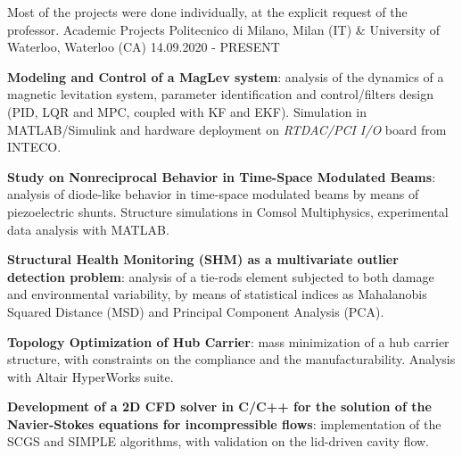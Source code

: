 

\begin{cventries}

    \cventry
    {Most of the projects were done individually, at the explicit request of the professor.}
    {Academic Projects}
    {Politecnico di Milano, Milan (IT) \& University of Waterloo, Waterloo (CA)}
    {14.09.2020 - PRESENT}
    {
        \begin{cvitems}
            \item {\textbf{Modeling and Control of a MagLev system}: analysis of the dynamics of a magnetic levitation system, parameter identification and control/filters design (PID, LQR and MPC, coupled with KF and EKF). Simulation in MATLAB/Simulink and hardware deployment on \textit{RTDAC/PCI I/O} board from INTECO.}
            \item {\textbf{Study on Nonreciprocal Behavior in Time-Space Modulated Beams}: analysis of diode-like behavior in time-space modulated beams by means of piezoelectric shunts. Structure simulations in Comsol Multiphysics, experimental data analysis with MATLAB.}
            \item {\textbf{Structural Health Monitoring (SHM) as a multivariate outlier detection problem}: analysis of a tie-rods element subjected to both damage and environmental variability, by means of statistical indices as Mahalanobis Squared Distance (MSD) and Principal Component Analysis (PCA).}
            \item {\textbf{Topology Optimization of Hub Carrier}: mass minimization of a hub carrier structure, with constraints on the compliance and the manufacturability. Analysis with Altair HyperWorks suite.}
            \item {\textbf{Development of a 2D CFD solver in C/C++ for the solution of the Navier-Stokes equations for incompressible flows}: implementation of the SCGS and SIMPLE algorithms, with validation on the lid-driven cavity flow.}
        \end{cvitems}
        \vspace{9pt}
    }


\end{cventries}
